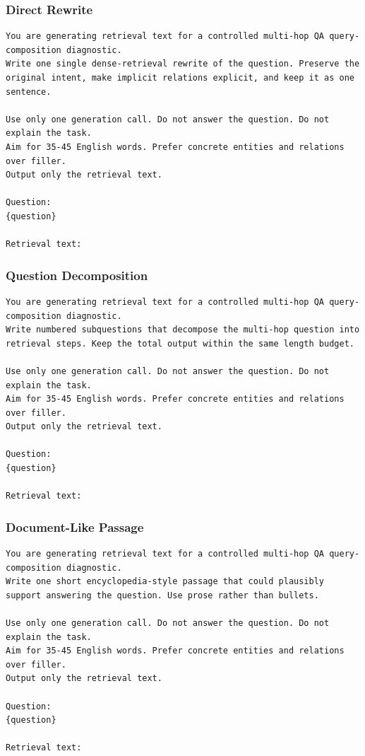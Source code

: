 \documentclass[pdflatex,sn-basic,Numbered]{sn-jnl}
\begin{document}
\subsubsection*{Direct Rewrite}
\begingroup\footnotesize
\begin{Verbatim}[breaklines=true,breakanywhere=false,breaksymbolleft={},breaksymbolright={}]
You are generating retrieval text for a controlled multi-hop QA query-composition diagnostic.
Write one single dense-retrieval rewrite of the question. Preserve the original intent, make implicit relations explicit, and keep it as one sentence.

Use only one generation call. Do not answer the question. Do not explain the task.
Aim for 35-45 English words. Prefer concrete entities and relations over filler.
Output only the retrieval text.

Question:
{question}

Retrieval text:
\end{Verbatim}
\endgroup

\subsubsection*{Question Decomposition}
\begingroup\footnotesize
\begin{Verbatim}[breaklines=true,breakanywhere=false,breaksymbolleft={},breaksymbolright={}]
You are generating retrieval text for a controlled multi-hop QA query-composition diagnostic.
Write numbered subquestions that decompose the multi-hop question into retrieval steps. Keep the total output within the same length budget.

Use only one generation call. Do not answer the question. Do not explain the task.
Aim for 35-45 English words. Prefer concrete entities and relations over filler.
Output only the retrieval text.

Question:
{question}

Retrieval text:
\end{Verbatim}
\endgroup

\subsubsection*{Document-Like Passage}
\begingroup\footnotesize
\begin{Verbatim}[breaklines=true,breakanywhere=false,breaksymbolleft={},breaksymbolright={}]
You are generating retrieval text for a controlled multi-hop QA query-composition diagnostic.
Write one short encyclopedia-style passage that could plausibly support answering the question. Use prose rather than bullets.

Use only one generation call. Do not answer the question. Do not explain the task.
Aim for 35-45 English words. Prefer concrete entities and relations over filler.
Output only the retrieval text.

Question:
{question}

Retrieval text:
\end{Verbatim}
\endgroup
\end{document}
